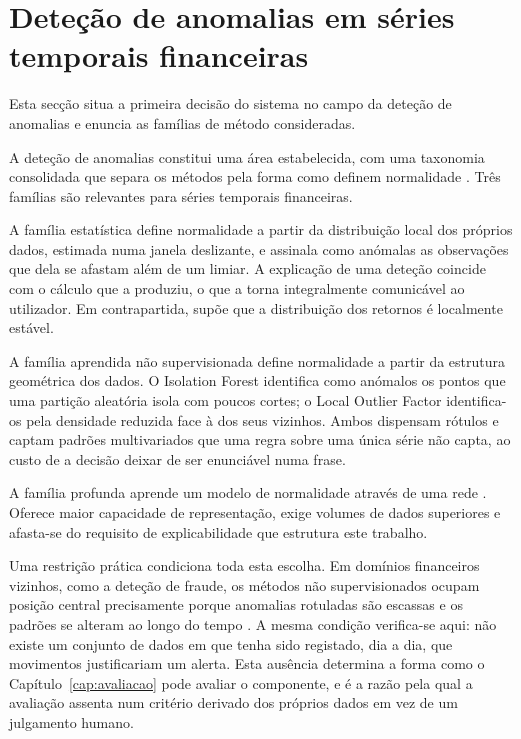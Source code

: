 \section{Deteção de anomalias em séries temporais financeiras}
\label{sec:ctx_anomalias}

Esta secção situa a primeira decisão do sistema no campo da deteção de anomalias e enuncia as
famílias de método consideradas.

A deteção de anomalias constitui uma área estabelecida, com uma taxonomia consolidada que separa os
métodos pela forma como definem normalidade \autocite{chandola2009anomaly, pang2021deep}. Três
famílias são relevantes para séries temporais financeiras.

A família estatística define normalidade a partir da distribuição local dos próprios dados,
estimada numa janela deslizante, e assinala como anómalas as observações que dela se afastam além
de um limiar. A explicação de uma deteção coincide com o cálculo que a produziu, o que a torna
integralmente comunicável ao utilizador. Em contrapartida, supõe que a distribuição dos retornos é
localmente estável.

A família aprendida não supervisionada define normalidade a partir da estrutura geométrica dos
dados. O Isolation Forest \autocite{liu2008isolation} identifica como anómalos os pontos que uma
partição aleatória isola com poucos cortes; o Local Outlier Factor \autocite{breunig2000lof}
identifica-os pela densidade reduzida face à dos seus vizinhos. Ambos dispensam rótulos e captam
padrões multivariados que uma regra sobre uma única série não capta, ao custo de a decisão deixar
de ser enunciável numa frase.

A família profunda aprende um modelo de normalidade através de uma rede \autocite{pang2021deep}.
Oferece maior capacidade de representação, exige volumes de dados superiores e afasta-se do
requisito de explicabilidade que estrutura este trabalho.

Uma restrição prática condiciona toda esta escolha. Em domínios financeiros vizinhos, como a
deteção de fraude, os métodos não supervisionados ocupam posição central precisamente porque
anomalias rotuladas são escassas e os padrões se alteram ao longo do tempo
\autocite{ahmed2016financial}. A mesma condição verifica-se aqui: não existe um conjunto de dados
em que tenha sido registado, dia a dia, que movimentos justificariam um alerta. Esta ausência
determina a forma como o Capítulo~\ref{cap:avaliacao} pode avaliar o componente, e é a razão pela
qual a avaliação assenta num critério derivado dos próprios dados em vez de um julgamento humano.

